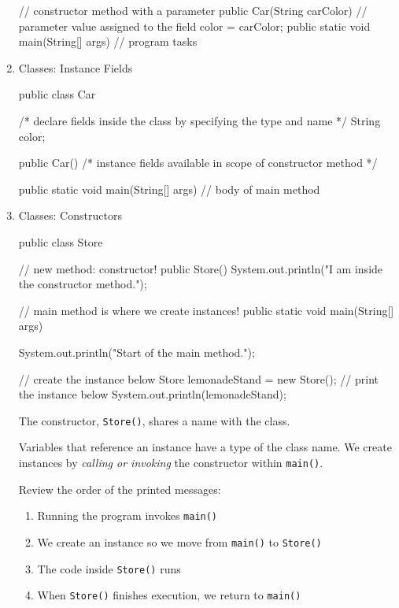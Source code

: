 \documentclass[a4paper,12pt]{article}
\begin{document}
\begin{enumerate}
\begin{javacode}
{  // constructor method with a parameter
  public Car(String carColor) {
    // parameter value assigned to the field
    color = carColor;
  }
  public static void main(String[] args) {
    // program tasks
  }
}
\end{javacode}

\item Classes: Instance Fields
\begin{javacode}
public class Car {
  /*
  declare fields inside the class
  by specifying the type and name
  */
  String color;

  public Car() {
    /* 
    instance fields available in
    scope of constructor method
    */
  }

  public static void main(String[] args) {
    // body of main method
  }
}
\end{javacode}

\item Classes: Constructors
\begin{javacode}
public class Store {
  
  // new method: constructor!
  public Store() {
    System.out.println("I am inside the constructor method.");
  }
  
  // main method is where we create instances!
  public static void main(String[] args) {
    System.out.println("Start of the main method.");
    
    // create the instance below
    Store lemonadeStand = new Store();
    // print the instance below
    System.out.println(lemonadeStand);
  }
}
\end{javacode}
The constructor, \verb|Store()|, shares a name with the class. 

Variables that reference an instance have a type of the class name. We create instances by \textit{calling or invoking} the constructor within \verb|main()|.

Review the order of the printed messages:
\renewcommand{\labelenumii}{$\diamond$}
\begin{enumerate}
\item Running the program invokes \verb|main()|

\item We create an instance so we move from \verb|main()| to \verb|Store()|

\item The code inside \verb|Store()| runs

\item When \verb|Store()| finishes execution, we return to \verb|main()|

\end{enumerate}


\end{enumerate}



\end{document}
